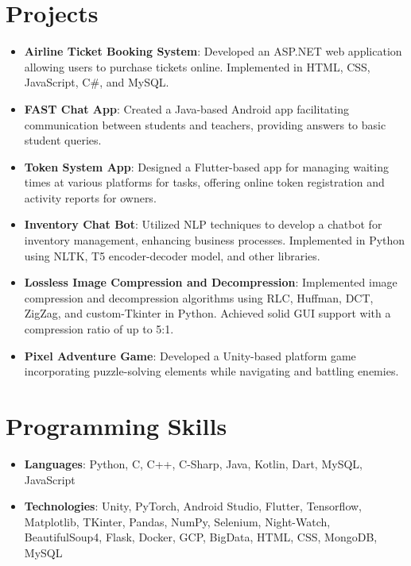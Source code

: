 \documentclass[letterpaper,11pt]{article}
\newcommand{\resumeItem}[2]{
  \item\small{
    \textbf{#1}{: #2 \vspace{-2pt}}
  }
}
\newcommand{\resumeSubItem}[2]{\resumeItem{#1}{#2}\vspace{-4pt}}
\newcommand{\resumeSubHeadingListStart}{\begin{itemize}[leftmargin=*]}
\newcommand{\resumeSubHeadingListEnd}{\end{itemize}}
\begin{document}
\section{Projects}
\resumeSubHeadingListStart
\resumeSubItem{Airline Ticket Booking System}
{Developed an ASP.NET web application allowing users to purchase tickets online. Implemented in HTML, CSS, JavaScript, C\#, and MySQL.}
\resumeSubItem{FAST Chat App}
{Created a Java-based Android app facilitating communication between students and teachers, providing answers to basic student queries.}
\resumeSubItem{Token System App}
{Designed a Flutter-based app for managing waiting times at various platforms for tasks, offering online token registration and activity reports for owners.}
\resumeSubItem{Inventory Chat Bot}
{Utilized NLP techniques to develop a chatbot for inventory management, enhancing business processes. Implemented in Python using NLTK, T5 encoder-decoder model, and other libraries.}
\resumeSubItem{Lossless Image Compression and Decompression}
{Implemented image compression and decompression algorithms using RLC, Huffman, DCT, ZigZag, and custom-Tkinter in Python. Achieved solid GUI support with a compression ratio of up to 5:1.}
\resumeSubItem{Pixel Adventure Game}
{Developed a Unity-based platform game incorporating puzzle-solving elements while navigating and battling enemies.}
\resumeSubHeadingListEnd

\section{Programming Skills}
\resumeSubHeadingListStart
\resumeSubItem{Languages}
{Python, C, C++, C-Sharp, Java, Kotlin, Dart, MySQL, JavaScript}
\resumeSubItem{Technologies}
{Unity, PyTorch, Android Studio, Flutter, Tensorflow, Matplotlib, TKinter, Pandas, NumPy, Selenium, Night-Watch, BeautifulSoup4, Flask, Docker, GCP, BigData, HTML, CSS, MongoDB, MySQL}
\resumeSubHeadingListEnd
\end{document}
